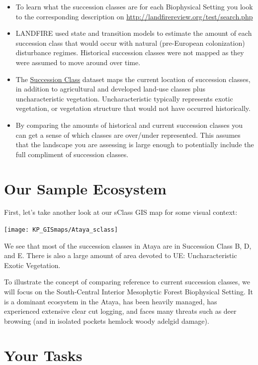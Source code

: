 \documentclass[
]{book}
\providecommand{\tightlist}{%
  \setlength{\itemsep}{0pt}\setlength{\parskip}{0pt}}
\begin{document}
\begin{itemize}
\tightlist
\item
  To learn what the succession classes are for each Biophysical Setting you look to the corresponding description on \url{http://landfirereview.org/test/search.php}
\item
  LANDFIRE used state and transition models to estimate the amount of each succession class that would occur with natural (pre-European colonization) disturbance regimes. Historical succession classes were not mapped as they were assumed to move around over time.
\item
  The \href{https://www.landfire.gov/sclass.php}{Succession Class} dataset maps the current location of succession classes, in addition to agricultural and developed land-use classes plus uncharacteristic vegetation. Uncharacteristic typically represents exotic vegetation, or vegetation structure that would not have occurred historically.
\item
  By comparing the amounts of historical and current succession classes you can get a sense of which classes are over/under represented. This assumes that the landscape you are assessing is large enough to potentially include the full compliment of succession classes.
\end{itemize}

\hypertarget{our-sample-ecosystem}{%
\section{Our Sample Ecosystem}\label{our-sample-ecosystem}}

First, let's take another look at our sClass GIS map for some visual context:

\texttt{[image: KP\_GISmaps/Ataya\_sclass]}

We see that most of the succession classes in Ataya are in Succession Class B, D, and E. There is also a large amount of area devoted to UE: Uncharacteristic Exotic Vegetation.

To illustrate the concept of comparing reference to current succession classes, we will focus on the South-Central Interior Mesophytic Forest Biophysical Setting. It is a dominant ecosystem in the Ataya, has been heavily managed, has experienced extensive clear cut logging, and faces many threats such as deer browsing (and in isolated pockets hemlock woody adelgid damage).

\hypertarget{your-tasks}{%
\section{Your Tasks}\label{your-tasks}}
\end{document}
